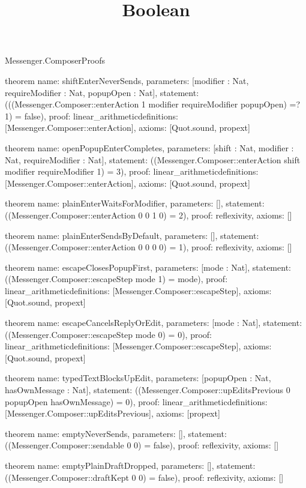 \begin{lexlean}{Messenger.ComposerProofs}
\title{Boolean}
\begin{semanticmodule}
theorem{
  name: shiftEnterNeverSends,
  parameters: [modifier : Nat, requireModifier : Nat, popupOpen : Nat],
  statement: (((Messenger.Composer::enterAction 1 modifier requireModifier popupOpen) =? 1) = false),
  proof: linear_arithmetic{definitions: [Messenger.Composer::enterAction]},
  axioms: [Quot.sound, propext]
}

theorem{
  name: openPopupEnterCompletes,
  parameters: [shift : Nat, modifier : Nat, requireModifier : Nat],
  statement: ((Messenger.Composer::enterAction shift modifier requireModifier 1) = 3),
  proof: linear_arithmetic{definitions: [Messenger.Composer::enterAction]},
  axioms: [Quot.sound, propext]
}

theorem{
  name: plainEnterWaitsForModifier,
  parameters: [],
  statement: ((Messenger.Composer::enterAction 0 0 1 0) = 2),
  proof: reflexivity{},
  axioms: []
}

theorem{
  name: plainEnterSendsByDefault,
  parameters: [],
  statement: ((Messenger.Composer::enterAction 0 0 0 0) = 1),
  proof: reflexivity{},
  axioms: []
}

theorem{
  name: escapeClosesPopupFirst,
  parameters: [mode : Nat],
  statement: ((Messenger.Composer::escapeStep mode 1) = mode),
  proof: linear_arithmetic{definitions: [Messenger.Composer::escapeStep]},
  axioms: [Quot.sound, propext]
}

theorem{
  name: escapeCancelsReplyOrEdit,
  parameters: [mode : Nat],
  statement: ((Messenger.Composer::escapeStep mode 0) = 0),
  proof: linear_arithmetic{definitions: [Messenger.Composer::escapeStep]},
  axioms: [Quot.sound, propext]
}

theorem{
  name: typedTextBlocksUpEdit,
  parameters: [popupOpen : Nat, hasOwnMessage : Nat],
  statement: ((Messenger.Composer::upEditsPrevious 0 popupOpen hasOwnMessage) = 0),
  proof: linear_arithmetic{definitions: [Messenger.Composer::upEditsPrevious]},
  axioms: [propext]
}

theorem{
  name: emptyNeverSends,
  parameters: [],
  statement: ((Messenger.Composer::sendable 0 0) = false),
  proof: reflexivity{},
  axioms: []
}

theorem{
  name: emptyPlainDraftDropped,
  parameters: [],
  statement: ((Messenger.Composer::draftKept 0 0) = false),
  proof: reflexivity{},
  axioms: []
}


\end{semanticmodule}
\end{lexlean}
